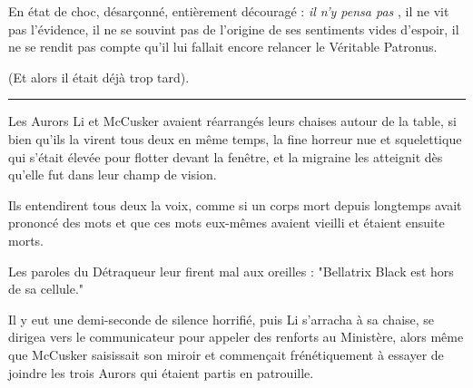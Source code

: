 En état de choc, désarçonné, entièrement découragé : \emph{il n'y pensa pas} , il ne vit pas l'évidence, il ne se souvint pas de l'origine de ses sentiments vides d'espoir, il ne se rendit pas compte qu'il lui fallait encore relancer le Véritable Patronus.

(Et alors il était déjà trop tard).
\par\noindent\rule{\textwidth}{0.4pt}
Les Aurors Li et McCusker avaient réarrangés leurs chaises autour de la table, si bien qu'ils la virent tous deux en même temps, la fine horreur nue et squelettique qui s'était élevée pour flotter devant la fenêtre, et la migraine les atteignit dès qu'elle fut dans leur champ de vision.

Ils entendirent tous deux la voix, comme si un corps mort depuis longtemps avait prononcé des mots et que ces mots eux-mêmes avaient vieilli et étaient ensuite morts.

Les paroles du Détraqueur leur firent mal aux oreilles : "Bellatrix Black est hors de sa cellule."

Il y eut une demi-seconde de silence horrifié, puis Li s'arracha à sa chaise, se dirigea vers le communicateur pour appeler des renforts au Ministère, alors même que McCusker saisissait son miroir et commençait frénétiquement à essayer de joindre les trois Aurors qui étaient partis en patrouille.

